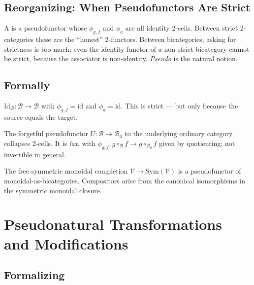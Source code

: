 \subsection{Reorganizing: When Pseudofunctors Are Strict}

A  is a pseudofunctor whose $\phi_{g,f}$ and $\phi_a$
are all identity 2-cells. Between strict 2-categories these are the ``honest''
2-functors. Between bicategories, asking for strictness is too much; even the
identity functor of a non-strict bicategory cannot be strict, because the
associator is non-identity. \emph{Pseudo} is the natural notion.

\subsection{Formally}

\begin{example_thm}
$\mathrm{Id}_\mathcal{B} : \mathcal{B} \to \mathcal{B}$ with $\phi_{g,f} =
\mathrm{id}$ and $\phi_a = \mathrm{id}$. This is strict — but only because
the source equals the target.
\end{example_thm}

\begin{example_thm}
The forgetful pseudofunctor $U : \mathcal{B} \to \mathcal{B}_0$ to the
underlying ordinary category collapses 2-cells. It is \emph{lax}, with
$\phi_{g,f} : g \circ_{\mathcal{B}} f \to g \circ_{\mathcal{B}_0} f$ given by
quotienting; not invertible in general.
\end{example_thm}

\begin{example_thm}
The free symmetric monoidal completion $\mathcal{V} \to \mathrm{Sym}(\mathcal{V})$
is a pseudofunctor of monoidal-as-bicategories. Compositors arise from the
canonical isomorphisms in the symmetric monoidal closure.
\end{example_thm}


\section{Pseudonatural Transformations and Modifications}
\label{sec:pseudonat-modifications}

\subsection{Formalizing}

